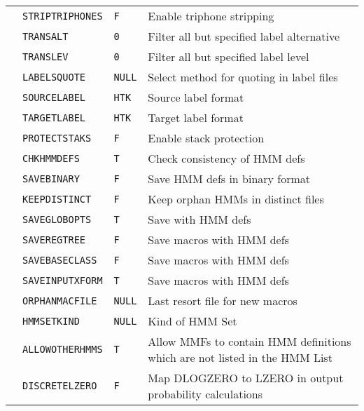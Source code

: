 \begin{center}
\begin{supertabular}{|p{1.8cm}|l|l|p{6.6cm}|}
  & \texttt{STRIPTRIPHONES} & \texttt{F} & Enable triphone stripping \\ 
  & \texttt{TRANSALT} & \texttt{0} & Filter all but specified label alternative \\ 
  & \texttt{TRANSLEV} & \texttt{0} & Filter all but specified label level \\ 
  & \texttt{LABELSQUOTE} & \texttt{NULL} & Select method for quoting in label files \\ 
  & \texttt{SOURCELABEL} & \texttt{HTK} & Source label format \\ 
  & \texttt{TARGETLABEL} & \texttt{HTK} & Target label format \\ \hline



 & \texttt{PROTECTSTAKS} & \texttt{F} & Enable stack protection \\ \hline


  & \texttt{CHKHMMDEFS} & \texttt{T} & Check consistency of HMM defs \\ 
  & \texttt{SAVEBINARY} & \texttt{F} & Save HMM defs in binary format \\ 
  & \texttt{KEEPDISTINCT} & \texttt{F} & Keep orphan HMMs in distinct files \\ 
  & \texttt{SAVEGLOBOPTS} & \texttt{T} & Save  with HMM defs \\ 
  & \texttt{SAVEREGTREE} & \texttt{F} & Save  macros with HMM defs \\ 
    & \texttt{SAVEBASECLASS} & \texttt{F} & Save  macros with HMM defs \\ 
  & \texttt{SAVEINPUTXFORM} & \texttt{T} & Save  macros with HMM defs \\ 
  & \texttt{ORPHANMACFILE} & \texttt{NULL} & Last resort file for new macros \\ 
  & \texttt{HMMSETKIND} & \texttt{NULL} & Kind of HMM Set \\ 
  & \texttt{ALLOWOTHERHMMS} & \texttt{T} & Allow MMFs to contain HMM definitions which are 
  not listed in the HMM List \\ 
  & \texttt{DISCRETELZERO}  & \texttt{F} & Map DLOGZERO to LZERO in output probability 
  calculations \\ \hline


\end{supertabular}
\end{center}
